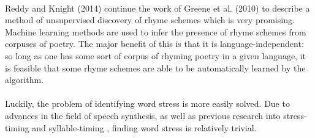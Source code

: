 \paragraph{}{Reddy and Knight (2014) \cite{reddy} continue the work of
  Greene et al. (2010) \cite{greene} to describe a method of
  unsupervised discovery of rhyme schemes which is very
  promising. Machine learning methods are used to infer the presence
  of rhyme schemes from corpuses of poetry. The major benefit of this
  is that it is language-independent: so long as one has some sort of
  corpus of rhyming poetry in a given language, it is feasible that
  some rhyme schemes are able to be automatically learned by the
  algorithm.}
\paragraph{}{Luckily, the problem of identifying word stress is more
  easily solved. Due to advances in the field of speech
  synthesis\cite{williams, liber}, as well as previous research into
  stress-timing and syllable-timing \cite{dauer}, finding word stress
  is relatively trivial. }
